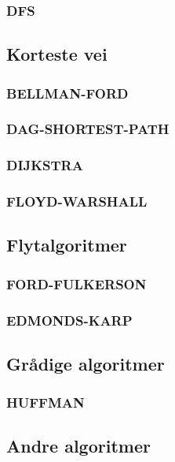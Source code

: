 \subsubsection{DFS}
\subsection{Korteste vei}
\subsubsection{BELLMAN-FORD}
\subsubsection{DAG-SHORTEST-PATH}
\subsubsection{DIJKSTRA}
\subsubsection{FLOYD-WARSHALL}
\subsection{Flytalgoritmer}
\subsubsection{FORD-FULKERSON}
\subsubsection{EDMONDS-KARP}
\subsection{Grådige algoritmer}
\subsubsection{HUFFMAN}
\subsection{Andre algoritmer}
